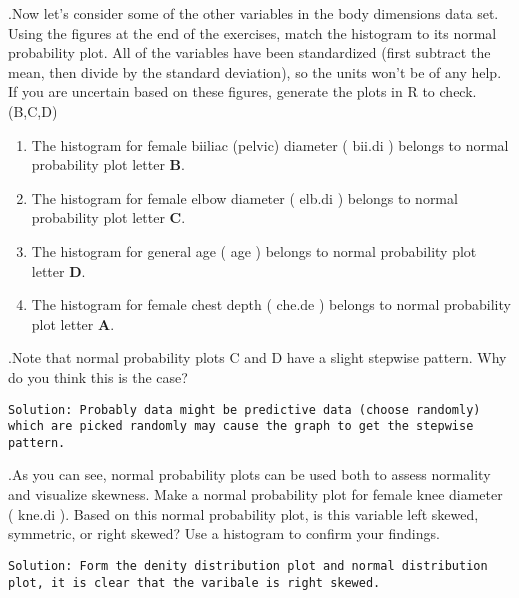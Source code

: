 \documentclass[]{article}
\newenvironment{Shaded}{\begin{snugshade}}{\end{snugshade}}
\newcommand{\DataTypeTok}[1]{\textcolor[rgb]{0.13,0.29,0.53}{#1}}
\newcommand{\DecValTok}[1]{\textcolor[rgb]{0.00,0.00,0.81}{#1}}
\newcommand{\KeywordTok}[1]{\textcolor[rgb]{0.13,0.29,0.53}{\textbf{#1}}}
\newcommand{\NormalTok}[1]{#1}
\newcommand{\OperatorTok}[1]{\textcolor[rgb]{0.81,0.36,0.00}{\textbf{#1}}}
\newcommand{\OtherTok}[1]{\textcolor[rgb]{0.56,0.35,0.01}{#1}}
\newcommand{\StringTok}[1]{\textcolor[rgb]{0.31,0.60,0.02}{#1}}
\begin{document}
.Now let's consider some of the other variables in the body dimensions
data set. Using the figures at the end of the exercises, match the
histogram to its normal probability plot. All of the variables have been
standardized (first subtract the mean, then divide by the standard
deviation), so the units won't be of any help. If you are uncertain
based on these figures, generate the plots in R to check. (B,C,D)

\begin{enumerate}
\def\labelenumi{\alph{enumi}.}
\item
  The histogram for female biiliac (pelvic) diameter ( bii.di ) belongs
  to normal probability plot letter \textbf{B}.
\item
  The histogram for female elbow diameter ( elb.di ) belongs to normal
  probability plot letter \textbf{C}.
\item
  The histogram for general age ( age ) belongs to normal probability
  plot letter \textbf{D}.
\item
  The histogram for female chest depth ( che.de ) belongs to normal
  probability plot letter \textbf{A}.
\end{enumerate}

.Note that normal probability plots C and D have a slight stepwise
pattern. Why do you think this is the case?

\begin{verbatim}
Solution: Probably data might be predictive data (choose randomly) which are picked randomly may cause the graph to get the stepwise pattern.
\end{verbatim}

.As you can see, normal probability plots can be used both to assess
normality and visualize skewness. Make a normal probability plot for
female knee diameter ( kne.di ). Based on this normal probability plot,
is this variable left skewed, symmetric, or right skewed? Use a
histogram to confirm your findings.

\begin{verbatim}
Solution: Form the denity distribution plot and normal distribution plot, it is clear that the varibale is right skewed. 
\end{verbatim}

\begin{Shaded}
\end{Shaded}
\end{document}
